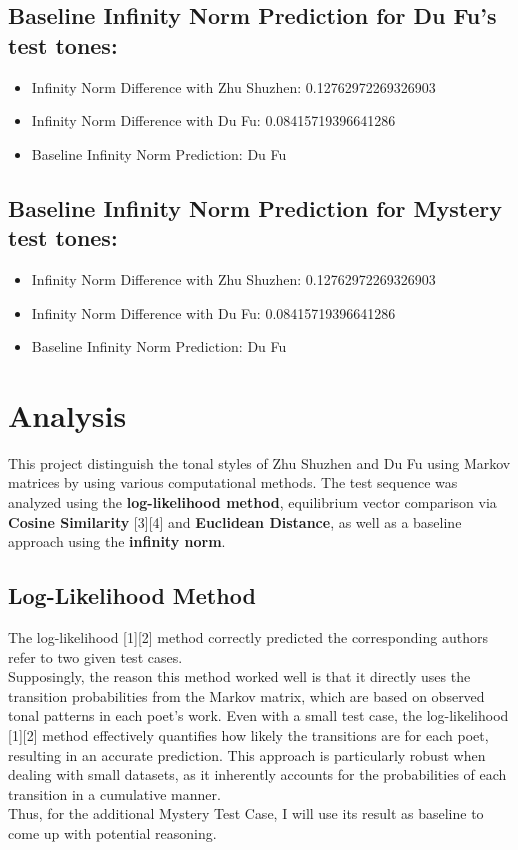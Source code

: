 \documentclass[12pt]{article}
\begin{document}
\subsection*{Baseline Infinity Norm Prediction for Du Fu's test tones:}


\begin{itemize}
    \item Infinity Norm Difference with Zhu Shuzhen: 0.12762972269326903
    \item Infinity Norm Difference with Du Fu: 0.08415719396641286
    \item Baseline Infinity Norm Prediction: Du Fu
\end{itemize}

\subsection*{Baseline Infinity Norm Prediction for Mystery test tones:}


\begin{itemize}
    \item Infinity Norm Difference with Zhu Shuzhen: 0.12762972269326903
    \item Infinity Norm Difference with Du Fu: 0.08415719396641286
    \item Baseline Infinity Norm Prediction: Du Fu
\end{itemize}

\section{Analysis}
This project distinguish the tonal styles of Zhu Shuzhen and Du Fu using Markov matrices by using various computational methods. The test sequence was analyzed using the \textbf{log-likelihood method}, equilibrium vector comparison via \textbf{Cosine Similarity} [3][4] and \textbf{Euclidean Distance}, as well as a baseline approach using the \textbf{infinity norm}.

\subsection*{Log-Likelihood Method}

The log-likelihood [1][2] method correctly predicted the corresponding authors refer to two given test cases.
\\
Supposingly, the reason this method worked well is that it directly uses the transition probabilities from the Markov matrix, which are based on observed tonal patterns in each poet's work. Even with a small test case, the log-likelihood [1][2] method effectively quantifies how likely the transitions are for each poet, resulting in an accurate prediction. 
This approach is particularly robust when dealing with small datasets, as it inherently accounts for the probabilities of each transition in a cumulative manner.
\\
Thus, for the additional Mystery Test Case, I will use its result as baseline to come up with potential reasoning.
\end{document}

